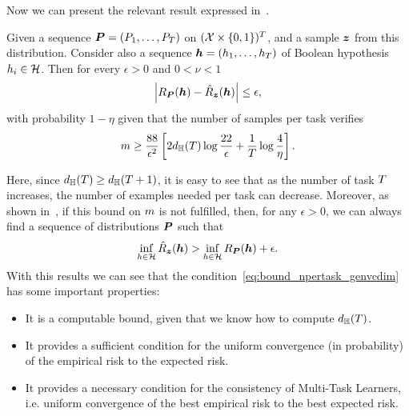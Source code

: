Now we can present the relevant result expressed in~\cite[Corollary~13]{baxter2000model}.
\begin{theorem}\label{th:baxter_vcdim}
    Given a sequence $\bm{P} = (P_1, \ldots, P_T)$ on $(\mathcal{X} \times \left\{0, 1\right\})^T$, and a sample $\bm{z}$ from this distribution. Consider also a sequence $\bm{h} = (h_1, \ldots, h_T)$ of Boolean hypothesis $h_i \in \mathcal{H}$. Then for every $\epsilon > 0$ and $0 < \nu < 1$
\begin{equation}
    \nonumber
    \left|R_{\bm{P}}(\bm{h}) - \hat{R}_{\bm{z}}(\bm{h})\right| \leq \epsilon,
\end{equation}
with probability $1 - \eta$ given that the number of samples per task verifies
\begin{equation}
    \label{eq:bound_npertask_genvcdim}
    \npertask \geq \frac{88}{\epsilon^2} \left[2 d_\hypspacef(\ntasks) \log \frac{22}{\epsilon} + \frac{1}{\ntasks}\log\frac{4}{\eta} \right] .
\end{equation}
\end{theorem}
Here, since $d_{\mathbb{H}}(T) \geq d_{\mathbb{H}}(T+1)$, it is easy to see that as the number of task $T$ increases, the number of examples needed per task can decrease. 
Moreover, as shown in~\cite[Theorem~14]{baxter2000model}, if this bound on $m$ is not fulfilled, then, for any $\epsilon > 0$, we can always find a sequence of distributions $\bm{P}$ such that
\begin{equation}
    \nonumber
    \inf_{h \in \mathcal{H}} \hat{R}_{\bm{z}}(\bm{h}) > \inf_{h \in \mathcal{H}} R_{\bm{P}}(\bm{h}) + \epsilon .
\end{equation}
With this results we can see that the condition~\eqref{eq:bound_npertask_genvcdim} has some important properties:
\begin{itemize}
    \item It is a computable bound, given that we know how to compute $d_{\mathbb{H}}(T)$.
    \item It provides a sufficient condition for the uniform convergence (in probability) of the empirical risk to the expected risk.
    \item It provides a necessary condition for the consistency of Multi-Task Learners, i.e. uniform convergence of the best empirical risk to the best expected risk.
\end{itemize}

